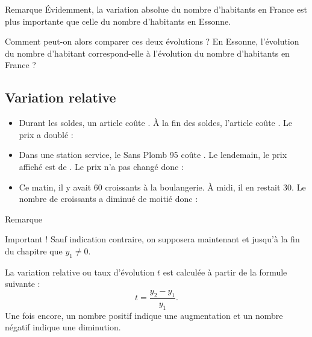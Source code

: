 \documentclass[xcolor={dvipsnames,svgnames,table}]{beamer}
\begin{document}
\begin{frame}{Remarque}
    \'Evidemment, la variation absolue du nombre d'habitants en France est plus importante que celle du nombre d'habitants en Essonne.\par Comment peut-on alors comparer ces deux évolutions ? En Essonne, l'évolution du nombre d'habitant correspond-elle à l'évolution du nombre d'habitants en France ?
\end{frame}

\subsection{Variation relative}

\begin{frame}
    \begin{Examples}
        \begin{itemize}[<+->]
            \item Durant les soldes, un article coûte . À la fin des soldes, l'article coûte . Le prix a doublé : \par\bigskip
            \item Dans une station service, le Sans Plomb 95 coûte . Le lendemain, le prix affiché est de . Le prix n'a pas changé donc : \bigskip
            \item Ce matin, il y avait $60$ croissants à la boulangerie. À midi, il en restait $30$. Le nombre de croissants a diminué de moitié donc :\bigskip
        \end{itemize}
    \end{Examples}
\end{frame}

\begin{frame}{Remarque}
    \begin{alertblock}{Important !}
        Sauf indication contraire, on supposera maintenant et jusqu'à la fin du chapitre que $y_1 \neq 0$.
    \end{alertblock}
\end{frame}

\begin{frame}
    \begin{Definition}
        La \alert{variation relative} ou \alert{taux d'évolution} $t$ est calculée à partir de la formule suivante : \[t = \frac{y_2 - y_1}{y_1}.\]
        Une fois encore, un nombre positif indique une augmentation et un nombre négatif indique une diminution.
    \end{Definition}
\end{frame}
\end{document}
